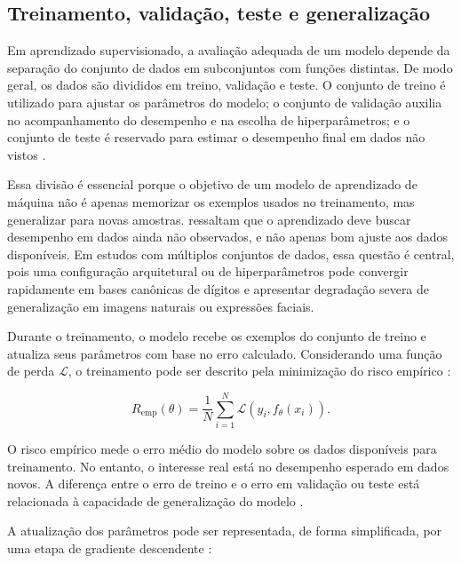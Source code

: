 \documentclass[
    12pt,
    openright,
    oneside,
    a4paper,
    english,
    brazil
]{abntex2}
\begin{document}
\subsection{Treinamento, validação, teste e generalização}
\label{subsec:treinamento_validacao_teste_generalizacao}

Em aprendizado supervisionado, a avaliação adequada de um modelo depende da separação do conjunto de dados em subconjuntos com funções distintas. De modo geral, os dados são divididos em treino, validação e teste. O conjunto de treino é utilizado para ajustar os parâmetros do modelo; o conjunto de validação auxilia no acompanhamento do desempenho e na escolha de hiperparâmetros; e o conjunto de teste é reservado para estimar o desempenho final em dados não vistos \cite{goodfellow2016deep,deisenroth2020mathematics}.

Essa divisão é essencial porque o objetivo de um modelo de aprendizado de máquina não é apenas memorizar os exemplos usados no treinamento, mas generalizar para novas amostras.  ressaltam que o aprendizado deve buscar desempenho em dados ainda não observados, e não apenas bom ajuste aos dados disponíveis. Em estudos com múltiplos conjuntos de dados, essa questão é central, pois uma configuração arquitetural ou de hiperparâmetros pode convergir rapidamente em bases canônicas de dígitos e apresentar degradação severa de generalização em imagens naturais ou expressões faciais.

Durante o treinamento, o modelo recebe os exemplos do conjunto de treino e atualiza seus parâmetros com base no erro calculado. Considerando uma função de perda \(\mathcal{L}\), o treinamento pode ser descrito pela minimização do risco empírico \cite{goodfellow2016deep,deisenroth2020mathematics}:

\begin{equation}
\label{eq:risco_empirico}
R_{\text{emp}}(\theta)
=
\frac{1}{N}
\sum_{i=1}^{N}
\mathcal{L}(y_i, f_{\theta}(x_i)).
\end{equation}

O risco empírico mede o erro médio do modelo sobre os dados disponíveis para treinamento. No entanto, o interesse real está no desempenho esperado em dados novos. A diferença entre o erro de treino e o erro em validação ou teste está relacionada à capacidade de generalização do modelo \cite{goodfellow2016deep,deisenroth2020mathematics}.

A atualização dos parâmetros pode ser representada, de forma simplificada, por uma etapa de gradiente descendente \cite{goodfellow2016deep,deisenroth2020mathematics}:
\end{document}
